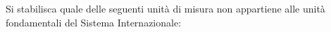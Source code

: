 Si stabilisca quale delle seguenti unità di misura non 
appartiene alle unità fondamentali del Sistema 
Internazionale: